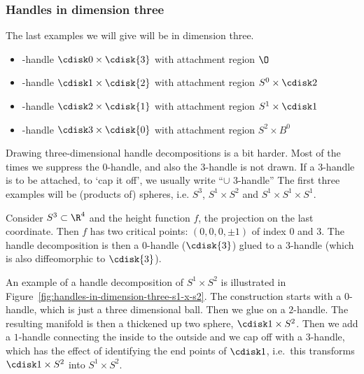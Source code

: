 \subsubsection*{Handles in dimension three}
The last examples we will give will be in dimension three.


\begin{itemize}
    \item  {}-handle  $ \cdisk0 \times \cdisk{3}$ with attachment region $\O$ 
        \hfill{}
    \item {}-handle  $ \cdisk1 \times \cdisk{2}$ with attachment region $ S^{0} \times \cdisk 2$
        \hfill{}
    \item {}-handle  $ \cdisk2 \times \cdisk{1}$ with attachment region $ S^{1} \times \cdisk1$
        \hfill{}
    \item {}-handle  $ \cdisk3 \times \cdisk{0}$ with attachment region $S^{2} \times B^{0}$
        \hfill{}
    \end{itemize}

Drawing three-dimensional handle decompositions is a bit harder. Most of the times we suppress the $0$-handle, and also the $3$-handle is not drawn. If a $3$-handle is to be attached, to `cap it off', we usually write ``$\cup $ $3$-handle''
The first three examples will be (products of) spheres, i.e. $S^{3}$, $S^{1} \times S^{2}$ and $S^{1} \times S^{1} \times S^{1}$.
\begin{eg}
    Consider $S^{3} \subset \R^{4}$ and the height function $f$, the projection on the last coordinate.
    Then $f$ has two critical points: $(0, 0, 0, \pm 1)$ of index $0$ and $3$.
    The handle decomposition is then a $0$-handle ($\cdisk{3}$) glued to a $3$-handle (which is also diffeomorphic to $\cdisk{3}$).
\end{eg}

\begin{eg}
    An example of a handle decomposition of $S^{1} \times S^{2}$ is illustrated in Figure~\ref{fig:handles-in-dimension-three-s1-x-s2}.
    The construction starts with a $0$-handle, which is just a three dimensional ball.
    Then we glue on a $2$-handle.
    The resulting manifold is then a thickened up two sphere, $\cdisk 1 \times S^{2}$.
    Then we add a $1$-handle connecting the inside to the outside and we cap off with a $3$-handle, which has the effect of identifying the end points of $\cdisk 1$, i.e.\ this transforms  $\cdisk 1 \times S^{2}$ into $ S^1 \times S^{2}$.
\end{eg}

